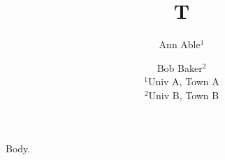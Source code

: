 \documentclass{article}
\title{T}
\author{Ann Able$^{1}$ \and Bob Baker$^{2}$\\ $^{1}$Univ A, Town A\\ $^{2}$Univ B, Town B}
\date{}
\begin{document}
\maketitle
Body.
\end{document}
